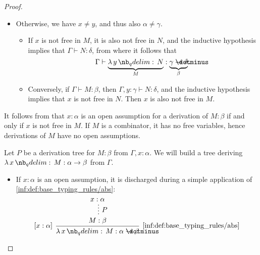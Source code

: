 \begin{proof}
\begin{itemize}
\begin{itemize}
      \item Otherwise, we have \( x \neq y \), and thus also \( \alpha \neq \gamma \).

      \begin{itemize}
        \item If \( x \) is not free in \( M \), it is also not free in \( N \), and the inductive hypothesis implies that \( \Gamma \vdash N: \delta \), from where it follows that
        \begin{equation*}
          \Gamma \vdash \underbrace{\qabs y N}_M: \underbrace{\gamma \synimplies \delta}_\beta.
        \end{equation*}

        \item Conversely, if \( \Gamma \vdash M: \beta \), then \( \Gamma, y: \gamma \vdash N: \delta \), and the inductive hypothesis implies that \( x \) is not free in \( N \). Then \( x \) is also not free in \( M \).
      \end{itemize}
    \end{itemize}
  \end{itemize}

   It follows from  that \( x: \alpha \) is an open assumption for a derivation of \( M: \beta \) if and only if \( x \) is not free in \( M \). If \( M \) is a combinator, it has no free variables, hence derivations of \( M \) have no open assumptions.


  \SufficiencySubProof* Let \( P \) be a derivation tree for \( M: \beta \) from \( \Gamma, x: \alpha \). We will build a tree deriving \( \qabs x M: \alpha \to \beta \) from \( \Gamma \).

  \begin{itemize}
    \item If \( x: \alpha \) is an open assumption, it is discharged during a simple application of \ref{inf:def:base_typing_rules/abs}:
    \begin{equation*}
      \begin{prooftree}
        \hypo{ x: \alpha }
        \ellipsis { \( P \) } { M: \beta }
        \infer[left label=\( [x: \alpha] \)]1[\ref{inf:def:base_typing_rules/abs}]{ \qabs x M: \alpha \synimplies \beta }
      \end{prooftree}
    \end{equation*}


\end{itemize}
\end{proof}
